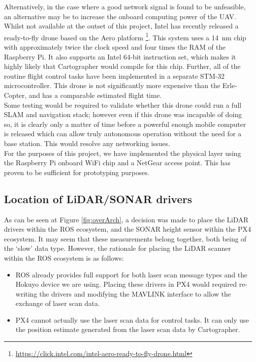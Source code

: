 \documentclass[capstone_report.tex]{subfiles}
\begin{document}
	Alternatively, in the case where a good network signal is found to be unfeasible, an alternative may be to increase the onboard computing power of the UAV. Whilst not available at the outset of this project, Intel has recently released a ready-to-fly drone based on the Aero platform \footnote{\url{https://click.intel.com/intel-aero-ready-to-fly-drone.html}}. This system uses a \SI{14}{\nano\meter} chip with approximately twice the clock speed and four times the RAM of the Raspberry Pi. It also supports an Intel 64-bit instruction set, which makes it highly likely that Cartographer would compile for this chip. Further, all of the routine flight control tasks have been implemented in a separate STM-32 microcontroller. This drone is not significantly more expensive than the Erle-Copter, and has a comparable estimated flight time.\\

	Some testing would be required to validate whether this drone could run a full SLAM and navigation stack; however even if this drone was incapable of doing so, it is clearly only a matter of time before a powerful enough mobile computer is released which can allow truly autonomous operation without the need for a base station. This would resolve any networking issues. \\

	For the purposes of this project, we have implemented the physical layer using the Raspberry Pi onboard WiFi chip and a NetGear access point. This has proven to be sufficient for prototyping purposes.

	\subsection{Location of LiDAR/SONAR drivers}
	As can be seen at Figure \ref{fig:overArch}, a decision was made to place the LiDAR drivers within the ROS ecosystem, and the SONAR height sensor within the PX4 ecosystem. It may seem that these measurements belong together, both being of the `slow' data type. However, the rationale for placing the LiDAR scanner within the ROS ecosystem is as follows:

	\begin{itemize}
		\item ROS already provides full support for both laser scan message types and the Hokuyo device we are using. Placing these drivers in PX4 would required re-writing the drivers and modifying the MAVLINK interface to allow the exchange of laser scan data.
		\item PX4 cannot actually use the laser scan data for control tasks. It can only use the position estimate generated from the laser scan data by Cartographer.
	\end{itemize}
\end{document}
